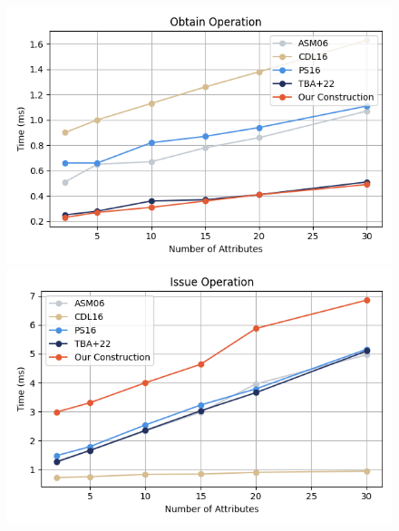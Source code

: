 \begin{figure}
    \begin{minipage}{0.48\textwidth}
        \centering
        \includegraphics[width=\textwidth]{figures/anoncreds_obtain.png}
    \end{minipage}
    \hfill
    \begin{minipage}{0.48\textwidth}
        \centering
        \includegraphics[width=\textwidth]{figures/anoncreds_issue.png}
    \end{minipage}
    
    \vspace{0.1cm}
    

\end{figure}
